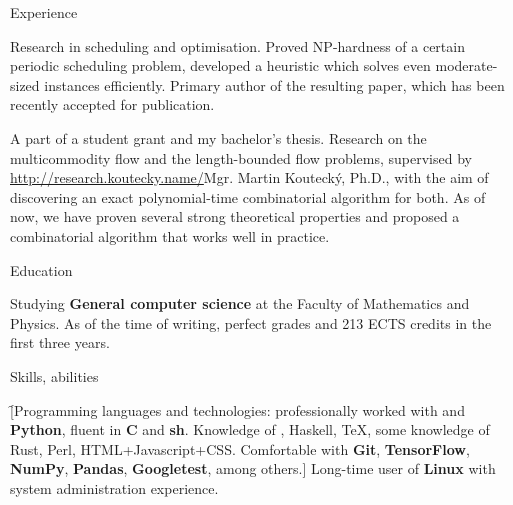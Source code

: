 


\newdimen\hei
\hei=1.5cm

\vskip 3mm
\doublecolumns

\sekce Experience

%
Research in scheduling and optimisation. Proved NP-hardness of a certain
periodic scheduling problem, developed a heuristic which solves even
moderate-sized instances efficiently. Primary author of the resulting paper,
which has been recently accepted for publication.

%
A part of a student grant and my bachelor's thesis. Research on the
multicommodity flow and the length-bounded flow problems, supervised by
\url{http://research.koutecky.name/}{Mgr. Martin Koutecký, Ph.D.}, with the aim
of discovering an exact polynomial-time combinatorial algorithm for both. As of now, we have proven
several strong theoretical properties and proposed a combinatorial algorithm
that works well in practice.

\sekce Education


Studying {\bf General computer science} at the Faculty of Mathematics and
Physics. As of the time of writing, perfect grades and 213 ECTS credits in the
first three years.

\sekce Skills, abilities

\f[Programming languages and technologies: professionally worked with {\bf
\Cpp} and {\bf Python}, fluent in {\bf C} and {\bf sh}. Knowledge of \Cis,
Haskell, \TeX, some knowledge of Rust, Perl, HTML+Javascript+CSS. Comfortable
with {\bf Git}, {\bf TensorFlow}, {\bf NumPy}, {\bf Pandas}, {\bf Googletest},
among others.] Long-time user of {\bf Linux} with system administration
experience.

